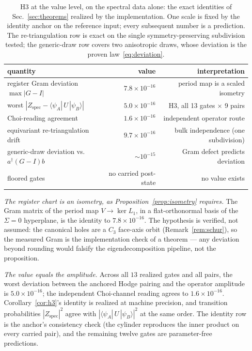 \documentclass[a4paper,twocolumn,11pt,unpublished]{quantumarticle}
\theoremstyle{plain}
\theoremstyle{remark}
\newcommand{\amp}[3]{\langle#1|\,#2\,|#3\rangle}
\newcommand{\Zspec}{Z_{\mathrm{spec}}}
\newcommand{\kerL}{\ker L}
\begin{document}
\begin{table}[t]
\centering
\small
\begin{tabular}{lrr}
\toprule
quantity & value & interpretation \\
\midrule
register Gram deviation $\max|G-I|$ & $7.8\times10^{-16}$ &
period map is a scaled isometry \\
worst $|\Zspec-\amp{\psi_A}{U}{\psi_B}|$ & $5.0\times10^{-16}$ &
H3, all 13 gates $\times$ 9 pairs \\
Choi-reading agreement & $1.6\times10^{-16}$ & independent operator route \\
equivariant re-triangulation drift & $9.7\times10^{-16}$ &
bulk independence (one subdivision) \\
generic-draw deviation vs.\ $a^\dagger(G-I)b$ & $\sim10^{-15}$ &
Gram defect predicts deviation \\
floored gates & no carried post-state & no value exists \\
\bottomrule
\end{tabular}
\caption{H3 at the value level, on the spectral data alone: the exact
identities of Sec.~\ref{sec:theorems} realized by the implementation.
One scale is fixed by the identity anchor on the reference input; every
subsequent number is a prediction. The re-triangulation row is exact on
the single symmetry-preserving subdivision tested; the generic-draw row
covers two anisotropic draws, whose deviation is the proven
law~\eqref{eq:deviation}.}
\label{tab:h3}
\end{table}

\emph{The register chart is an isometry, as
Proposition~\ref{prop:isometry} requires.} The Gram matrix of the period
map $V\to\kerL_1$, in a flat-orthonormal basis of the $\Sigma=0$
hyperplane, is the identity to $7.8\times10^{-16}$. The hypothesis is
verified, not assumed: the canonical holes are a $C_3$ face-axis orbit
(Remark~\ref{rem:schur}), so the measured Gram is the implementation
check of a theorem --- any deviation beyond rounding would falsify the
eigendecomposition pipeline, not the proposition.

\emph{The value equals the amplitude.} Across all $13$ realized gates and
all pairs, the worst deviation between the anchored Hodge pairing and the
operator amplitude is $5.0\times10^{-16}$; the independent Choi-channel
reading agrees to $1.6\times10^{-16}$. Corollary~\ref{cor:h3}'s identity
is realized at machine precision, and transition probabilities
$|\Zspec|^2$ agree with $|\amp{\psi_A}{U}{\psi_B}|^2$ at the same order.
The identity row is the anchor's consistency check (the cylinder
reproduces the inner product on every carried pair), and the remaining
twelve gates are parameter-free predictions.
\end{document}
